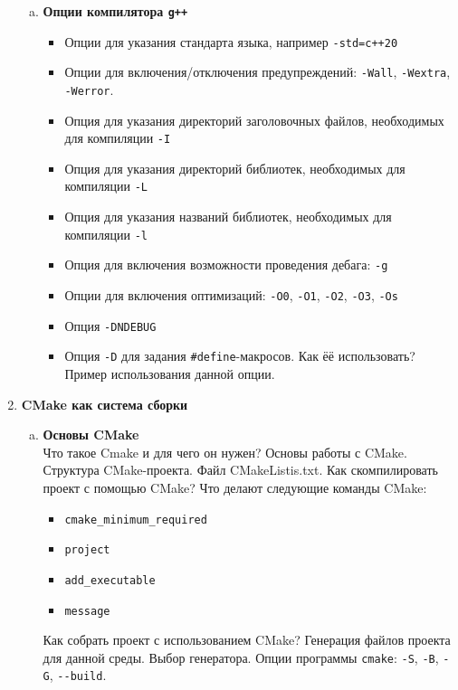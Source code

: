 \documentclass{article}
\begin{document}
\begin{enumerate}
\begin{enumerate}[a.]
\item \textbf{Опции компилятора \texttt{g++}}
\begin{itemize} 
\item Опции для указания стандарта языка, например \texttt{-std=c++20}
\item Опции для включения/отключения предупреждений: \texttt{-Wall}, \texttt{-Wextra}, \texttt{-Werror}.
\item Опция для указания директорий заголовочных файлов, необходимых для компиляции \texttt{-I}
\item Опция для указания директорий библиотек, необходимых для компиляции \texttt{-L}
\item Опция для указания названий библиотек, необходимых для компиляции \texttt{-l}
\item Опция для включения возможности проведения дебага: \texttt{-g}
\item Опции для включения оптимизаций: \texttt{-O0}, \texttt{-O1}, \texttt{-O2}, \texttt{-O3}, \texttt{-Os}
\item Опция \texttt{-DNDEBUG}
\item Опция \texttt{-D} для задания \texttt{\#define}-макросов. Как ёё использовать? Пример использования данной опции.
\end{itemize}
\end{enumerate}







\item \textbf{CMake как система сборки}
\begin{enumerate}[a.]

\item \textbf{Основы CMake}\\
Что такое Cmake и для чего он нужен? Основы работы с CMake. Структура CMake-проекта. Файл CMakeListis.txt.
Как скомпилировать проект с помощью CMake? Что делают следующие команды CMake:
\begin{itemize}
\item \texttt{cmake\_minimum\_required}
\item \texttt{project}
\item \texttt{add\_executable}
\item \texttt{message}
\end{itemize}

Как собрать проект с использованием CMake? Генерация файлов проекта для данной среды. Выбор генератора.
Опции программы \texttt{cmake}: \texttt{-S}, \texttt{-B}, \texttt{-G}, \texttt{-{}-build}.



\end{enumerate}
\end{enumerate}
\end{document}
